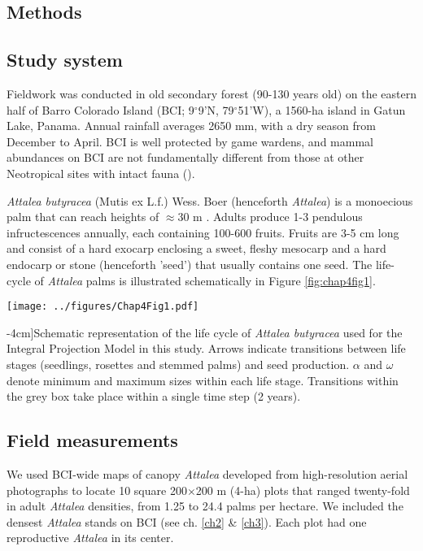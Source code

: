 \documentclass[b5paper,justified]{tufte-book} %
\begin{document}
\begin{fullwidth}
\section{Methods}

\subsection{Study system}
Fieldwork was conducted in old secondary forest (90-130 years old) on the eastern half of Barro Colorado Island (BCI; 9$^{\circ}$9'N, 79$^{\circ}$51'W), a 1560-ha island in Gatun Lake, Panama.  Annual rainfall averages 2650 mm, with a dry season from December to April. BCI is well protected by game wardens, and mammal abundances on BCI are not fundamentally different from those at other Neotropical sites with intact fauna (\citealt{Wright1994}). 

\textit{Attalea butyracea} (Mutis ex L.f.) Wess. Boer (henceforth \textit{Attalea}) is a monoecious palm that can reach heights of $\approx$30 m \citep{DeSteven1987}. Adults produce 1-3 pendulous infructescences annually, each containing 100-600 fruits. Fruits are 3-5 cm long and consist of a hard exocarp enclosing a sweet, fleshy mesocarp and a hard endocarp or stone (henceforth 'seed') that usually contains one seed. The life-cycle of \textit{Attalea} palms is illustrated schematically in Figure \ref{fig:chap4fig1}.

\begin{landscape}
\begin{figure*}
\hspace*{5cm} \texttt{[image: ../figures/Chap4Fig1.pdf]}
\caption[Schematic representation of the life cycle of \textit{Attalea butyracea}][-4cm]{Schematic representation of the life cycle of \textit{Attalea butyracea} used for the Integral Projection Model in this study. Arrows indicate transitions between life stages (seedlings, rosettes and stemmed palms) and seed production. $\alpha$ and $\omega$ denote minimum and maximum sizes within each life stage. Transitions within the grey box take place within a single time step (2 years).}
\label{fig:chap4fig1}
\end{figure*}
\end{landscape}

\subsection{Field measurements}

We used BCI-wide maps of canopy \textit{Attalea} developed from high-resolution aerial photographs \citep{Jansen2008} to locate 10 square 200$\times$200 m (4-ha) plots that ranged twenty-fold in adult \textit{Attalea} densities, from 1.25 to 24.4 palms per hectare. We included the densest \textit{Attalea} stands on BCI (see ch. \ref{ch2} \& \ref{ch3}). Each plot had one reproductive \textit{Attalea} in its center.


\end{fullwidth}
\end{document}
